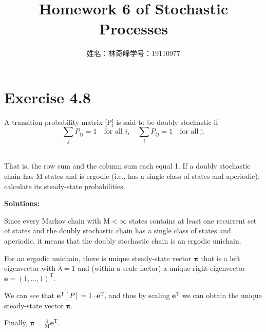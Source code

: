 \documentclass{article}
\begin{document}
    \title{Homework 6 of Stochastic Processes}
    \author{姓名：林奇峰\qquad 学号：19110977}
    \maketitle

    \section{Exercise 4.8}
    A transition probability matrix [P] is said to be doubly stochastic if 
    \begin{equation*}
        \sum_j P_{ij}=1\quad\text{for all }i ,\quad\sum_i P_{ij}=1\quad\text{for all j.}
    \end{equation*}
    \

    That is, the row sum and the column sum each equal 1. If a doubly stochastic chain has $\text{M}$ states and is ergodic (i.e., has a single class of states and aperiodic), calculate its steady-state probabilities.

    \textbf{Solutions:}
    
    Since every Markov chain with $\text{M}<\infty$ states contains at least one recurrent set of states and the doubly stochastic chain has a single class of states and aperiodic, it means that the doubly stochastic chain is an ergodic unichain.

    For an ergodic unichain, there is unique steady-state vector $\bm{\pi}$ that is a left eigenvector with $\lambda=1$ and (within a scale factor) a unique right eigenvector $\bm{e}=(1,\dots,1)^{\text{T}}$.

    We can see that $\bm{e}^\text{T}[P]=1\cdot\bm{e}^\text{T}$, and thus by scaling $\bm{e}^\text{T}$ we can obtain the unique steady-state vector $\bm{\pi}$.

    Finally, $\bm{\pi}=\frac{1}{\text{M}}\bm{e}^\text{T}$.
\end{document}
